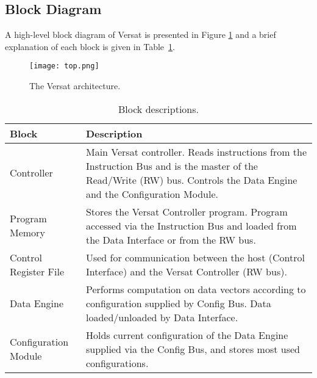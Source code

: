 \subsection{Block Diagram}
\label{sec:bd}

A high-level block diagram of Versat is presented in Figure
\ref{fig:versat_arch} and a brief explanation of each block is given
in Table~\ref{tab:blocks}.

\begin{figure}[!htbp]
    \centerline{\texttt{[image: top.png]}}
    \vspace{0cm}\caption{The Versat architecture.}
    \label{fig:versat_arch}
\end{figure}

\begin{table}[!h]
  \centering
    \begin{tabular}{|p{2cm}|p{12cm}|}
    \hline 
    {\bf Block} & {\bf Description} \\
    \hline \hline 
     Controller & Main Versat controller. Reads instructions from the Instruction Bus and is the master of the Read/Write (RW) bus. Controls the Data Engine and the Configuration Module. \\
    \hline
     Program Memory & Stores the Versat Controller program. Program accessed via the Instruction Bus and loaded from the Data Interface or from the RW bus. \\
    \hline
     Control Register File & Used for communication between the host (Control Interface) and the Versat Controller (RW bus). \\
    \hline
     Data Engine & Performs computation on data vectors according to configuration supplied by Config Bus. Data loaded/unloaded by Data Interface.\\
    \hline
     Configuration Module & Holds current configuration of the Data Engine supplied via the Config Bus, and stores most used configurations. \\
    \hline
    \end{tabular}
  \caption{Block descriptions.}
  \label{tab:blocks}
\end{table}
